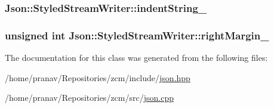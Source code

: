 \subsubsection[{\texorpdfstring{indent\+String\+\_\+}{indentString_}}]{ Json\+::\+Styled\+Stream\+Writer\+::indent\+String\+\_\+\hspace{0.3cm}{\ttfamily [private]}}\hypertarget{classJson_1_1StyledStreamWriter_a1481433ebe1491ea83b0beb92aed56c2}{}\label{classJson_1_1StyledStreamWriter_a1481433ebe1491ea83b0beb92aed56c2}
\subsubsection[{\texorpdfstring{right\+Margin\+\_\+}{rightMargin_}}]{\setlength{\rightskip}{0pt plus 5cm}unsigned int Json\+::\+Styled\+Stream\+Writer\+::right\+Margin\+\_\+\hspace{0.3cm}{\ttfamily [private]}}\hypertarget{classJson_1_1StyledStreamWriter_a94299ec0a9bb925b2dbbab7c1f2b390a}{}\label{classJson_1_1StyledStreamWriter_a94299ec0a9bb925b2dbbab7c1f2b390a}


The documentation for this class was generated from the following files\+:\begin{DoxyCompactItemize}
\item 
/home/pranav/\+Repositories/zcm/include/\hyperlink{json_8hpp}{json.\+hpp}\item 
/home/pranav/\+Repositories/zcm/src/\hyperlink{json_8cpp}{json.\+cpp}\end{DoxyCompactItemize}
